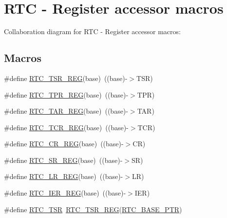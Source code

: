 \hypertarget{group___r_t_c___register___accessor___macros}{}\section{R\+TC -\/ Register accessor macros}
\label{group___r_t_c___register___accessor___macros}
Collaboration diagram for R\+TC -\/ Register accessor macros\+:
\subsection*{Macros}
\begin{DoxyCompactItemize}
\item 
\#define \hyperlink{group___r_t_c___register___accessor___macros_ga8e35afa52e674ff535ecc57472498ca8}{R\+T\+C\+\_\+\+T\+S\+R\+\_\+\+R\+EG}(base)~((base)-\/$>$T\+SR)
\item 
\#define \hyperlink{group___r_t_c___register___accessor___macros_gac08a2bfcaf64e65e8192ea268057da7c}{R\+T\+C\+\_\+\+T\+P\+R\+\_\+\+R\+EG}(base)~((base)-\/$>$T\+PR)
\item 
\#define \hyperlink{group___r_t_c___register___accessor___macros_ga161cb8068d36702819a6097fa4716025}{R\+T\+C\+\_\+\+T\+A\+R\+\_\+\+R\+EG}(base)~((base)-\/$>$T\+AR)
\item 
\#define \hyperlink{group___r_t_c___register___accessor___macros_ga4659f1e235bf0cbc0ec63c689645761b}{R\+T\+C\+\_\+\+T\+C\+R\+\_\+\+R\+EG}(base)~((base)-\/$>$T\+CR)
\item 
\#define \hyperlink{group___r_t_c___register___accessor___macros_ga32aa9fd38e099ee1a01f094e5389a794}{R\+T\+C\+\_\+\+C\+R\+\_\+\+R\+EG}(base)~((base)-\/$>$CR)
\item 
\#define \hyperlink{group___r_t_c___register___accessor___macros_gab87ebfc55a2b4e49ef0c0a52819e27b0}{R\+T\+C\+\_\+\+S\+R\+\_\+\+R\+EG}(base)~((base)-\/$>$SR)
\item 
\#define \hyperlink{group___r_t_c___register___accessor___macros_gab021dc45ed50ff0798b8892ea750b0ff}{R\+T\+C\+\_\+\+L\+R\+\_\+\+R\+EG}(base)~((base)-\/$>$LR)
\item 
\#define \hyperlink{group___r_t_c___register___accessor___macros_gae828cb00658a689e8c78a1c2a489ae92}{R\+T\+C\+\_\+\+I\+E\+R\+\_\+\+R\+EG}(base)~((base)-\/$>$I\+ER)
\item 
\#define \hyperlink{group___r_t_c___register___accessor___macros_gac34515e965b8b5efb13b40d7928c15a7}{R\+T\+C\+\_\+\+T\+SR}~\hyperlink{group___r_t_c___register___accessor___macros_ga8e35afa52e674ff535ecc57472498ca8}{R\+T\+C\+\_\+\+T\+S\+R\+\_\+\+R\+EG}(\hyperlink{group___r_t_c___peripheral_ga6455e2b767b4b224b4f00b50e87a2441}{R\+T\+C\+\_\+\+B\+A\+S\+E\+\_\+\+P\+TR})

\end{DoxyCompactItemize}
